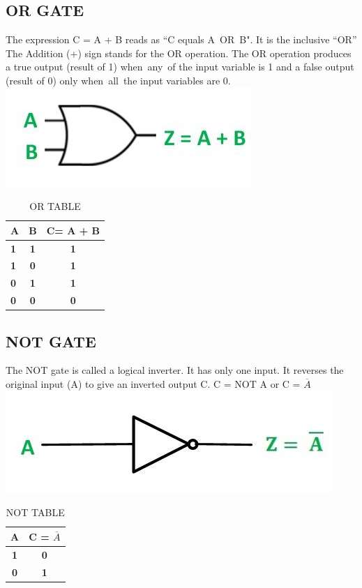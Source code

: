 \documentclass{article}
\begin{document}
\subsection{OR GATE}
The expression C = A + B reads as “C equals A OR B". It is the inclusive “OR”
The Addition (+) sign stands for the OR operation.
The OR operation produces a true output (result of 1) when any of the input variable is 1 and a false output (result of 0) only when all the input variables are 0.
\includegraphics[width=0.6\linewidth]{or.jpg}
\begin{table}
	\begin{center}
		\caption{OR TABLE}
		\begin{tabular}{l|c|c|}
			\textbf{A} & \textbf{B} & \textbf{C= A + B} \\
			\hline
			\textbf{1} & \textbf{1} & \textbf{1} \\
			\textbf{1} & \textbf{0} & \textbf{1} \\
			\textbf{0} & \textbf{1} & \textbf{1} \\
			\textbf{0} & \textbf{0} & \textbf{0} \\
		\end{tabular}
	\end{center}
\end{table}
\newpage
\subsection{NOT GATE}
The NOT gate is called a logical inverter.
It has only one input. It reverses the original input (A) to give an inverted output C.
C = NOT A or C = $\overline{A}$
\includegraphics[width=0.6\linewidth]{not.jpg}

\begin{table}[h!]
	\begin{center}
		\caption{NOT TABLE}
		\begin{tabular}{c|c|}
			\textbf{A} & \textbf{C = $\overline{A}$} \\
			\hline
			\textbf{1} & \textbf{0} \\
			\textbf{0} & \textbf{1} \\
		\end{tabular}
	\end{center}
\end{table}
\end{document}
